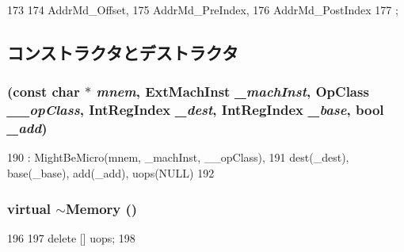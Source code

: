 \begin{DoxyCode}
173                   {
174         AddrMd_Offset,
175         AddrMd_PreIndex,
176         AddrMd_PostIndex
177     };
\end{DoxyCode}


\subsection{コンストラクタとデストラクタ}
\hypertarget{classArmISA_1_1Memory_afe107d6d2ae3ba3d801594034a8b25ca}{
\subsubsection[{Memory}]{ (const char $\ast$ {\em mnem}, \/  {\bf ExtMachInst} {\em \_\-machInst}, \/  OpClass {\em \_\-\_\-opClass}, \/  {\bf IntRegIndex} {\em \_\-dest}, \/  {\bf IntRegIndex} {\em \_\-base}, \/  bool {\em \_\-add})}}
\label{classArmISA_1_1Memory_afe107d6d2ae3ba3d801594034a8b25ca}



\begin{DoxyCode}
190         : MightBeMicro(mnem, _machInst, __opClass),
191           dest(_dest), base(_base), add(_add), uops(NULL)
192     {}
\end{DoxyCode}
\hypertarget{classArmISA_1_1Memory_a9c1fdd45550b31acf896fea338961fc1}{
\subsubsection[{$\sim$Memory}]{\setlength{\rightskip}{0pt plus 5cm}virtual $\sim${\bf Memory} ()}}
\label{classArmISA_1_1Memory_a9c1fdd45550b31acf896fea338961fc1}



\begin{DoxyCode}
196     {
197         delete [] uops;
198     }
\end{DoxyCode}


